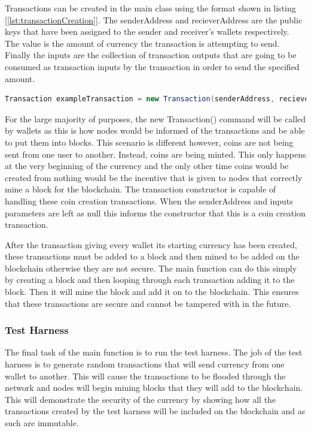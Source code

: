 \documentclass{l4proj}
\begin{document}
Transactions can be created in the main class using the
format shown in listing [\ref{lst:transactionCreation}]. The senderAddress and recieverAddress are the public keys
that have been assigned to the sender and receiver's wallets respectively. The value is the amount of currency the
transaction is attempting to send. Finally the inputs are the collection of transaction outputs that are going
to be consumed as transaction inputs by the transaction in order to send the specified amount.

\begin{lstlisting}[language=java, float=h, caption={This code snippet shows how transactions are created using
    the address of the sender, the address of the receiver, the value of the transaction, and the transaction
    inputs that are to be consumed by the transaction.}, label=lst:transactionCreation]
    Transaction exampleTransaction = new Transaction(senderAddress, recieverAddress, value, inputs);
\end{lstlisting}

For the large majority of purposes, the new Transaction() command will be called by wallets as this is how nodes
would be informed of the transactions and be able to put them into blocks. This scenario is different however, coins
are not being sent from one user to another. Instead, coins are being minted. This only happens at the very beginning
of the currency and the only other time coins would be created from nothing would be the incentive that is given
to nodes that correctly mine a block for the blockchain. The transaction constructor is capable of handling these
coin creation transactions. When the senderAddress and inputs parameters are left as null this informs the 
constructor that this is a coin creation transaction.

After the transaction giving every wallet its starting currency has been created, these transactions must be
added to a block and then mined to be added on the blockchain otherwise they are not secure. The main function
can do this simply by creating a block and then looping through each transaction adding it to the block. Then it will
mine the block and add it on to the blockchain. This ensures that these transactions are secure and cannot be tampered
with in the future.

\subsubsection{Test Harness}
The final task of the main function is to run the test harness. The job of the test harness is to generate 
random transactions that will send currency from one wallet to another. This will cause the transactions to 
be flooded through the network and nodes will begin mining blocks that they will add to the blockchain. This will
demonstrate the security of the currency by showing how all the transactions created by the test harness will
be included on the blockchain and as such are immutable.
\end{document}
